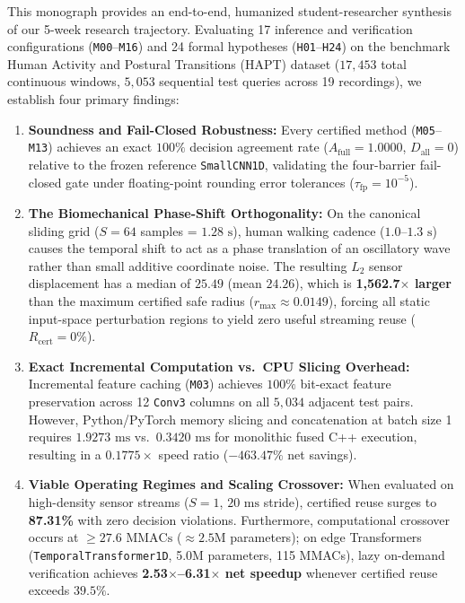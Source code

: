 \documentclass[journal,onecolumn,10pt]{IEEEtran}
\newcommand{\code}[1]{{\small\ttfamily\nolinkurl{#1}}}
\theoremstyle{remark}
\begin{document}
\begin{titlepage}
{{This monograph provides an end-to-end, humanized student-researcher synthesis of our 5-week research trajectory. Evaluating 17 inference and verification configurations (\code{M00}--\code{M16}) and 24 formal hypotheses (\code{H01}--\code{H24}) on the benchmark Human Activity and Postural Transitions (HAPT) dataset ($17,453$ total continuous windows, $5,053$ sequential test queries across 19 recordings), we establish four primary findings:
\begin{enumerate}[leftmargin=1.4em]
  \item \textbf{Soundness and Fail-Closed Robustness:} Every certified method (\code{M05}--\code{M13}) achieves an exact $100\%$ decision agreement rate ($A_{\text{full}} = 1.0000$, $D_{\text{all}} = 0$) relative to the frozen reference \code{SmallCNN1D}, validating the four-barrier fail-closed gate under floating-point rounding error tolerances ($\tau_{\text{fp}} = 10^{-5}$).
  \item \textbf{The Biomechanical Phase-Shift Orthogonality:} On the canonical sliding grid ($S=64$ samples = $1.28\text{ s}$), human walking cadence ($1.0\text{--}1.3\text{ s}$) causes the temporal shift to act as a phase translation of an oscillatory wave rather than small additive coordinate noise. The resulting $L_2$ sensor displacement has a median of $25.49$ (mean $24.26$), which is \textbf{1,562.7$\times$ larger} than the maximum certified safe radius ($r_{\max} \approx 0.0149$), forcing all static input-space perturbation regions to yield zero useful streaming reuse ($R_{\text{cert}} = 0\%$).
  \item \textbf{Exact Incremental Computation vs.\ CPU Slicing Overhead:} Incremental feature caching (\code{M03}) achieves $100\%$ bit-exact feature preservation across 12 \code{Conv3} columns on all $5,034$ adjacent test pairs. However, Python/PyTorch memory slicing and concatenation at batch size 1 requires $1.9273\text{ ms}$ vs.\ $0.3420\text{ ms}$ for monolithic fused C++ execution, resulting in a $0.1775\times$ speed ratio ($-463.47\%$ net savings).
  \item \textbf{Viable Operating Regimes and Scaling Crossover:} When evaluated on high-density sensor streams ($S=1$, $20\text{ ms}$ stride), certified reuse surges to \textbf{87.31\%} with zero decision violations. Furthermore, computational crossover occurs at $\ge 27.6\text{ MMACs}$ ($\approx 2.5\text{M}$ parameters); on edge Transformers (\code{TemporalTransformer1D}, 5.0M parameters, 115 MMACs), lazy on-demand verification achieves \textbf{2.53$\times$--6.31$\times$ net speedup} whenever certified reuse exceeds $39.5\%$.
\end{enumerate}
}}
\vfill
\end{titlepage}
\hypersetup{pageanchor=true}
\end{document}
